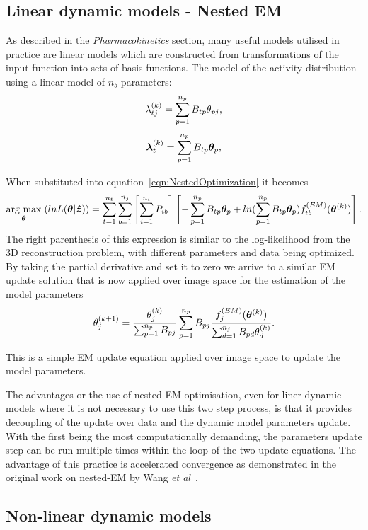 \subsection{Linear dynamic models - Nested EM}
As described in the \textit{Pharmacokinetics} section, many useful models utilised in practice are linear models which are constructed from transformations of the input function into sets of basis functions.
The model of the activity distribution using a linear model of $n_b$ parameters:
\begin{equation}
\lambda_{tj}^{(k)} = \sum_{p=1}^{n_p} B_{tp}   \theta_{pj} \\, 
\end{equation}
\begin{equation}
\bm\lambda_{t}^{(k)} = \sum_{p=1}^{n_p} B_{tp}  \bm\theta_{p}  \\,
\end{equation}

When substituted into equation~\ref{eqn:NestedOptimization} it becomes
\begin{equation}
\underset{\bm{\theta}}{\operatorname{arg}\,\operatorname{max}}\;(lnL(\bm{\theta}|\bm{\hat{z}})) = 
\sum_{t=1}^{n_t} \sum_{b=1}^{n_j} \left[ \sum_{i=1}^{n_i}  P_{ib} \right]
\left[ 
-\sum_{p=1}^{n_p} B_{tp} \bm\theta_{p} + 
ln( \sum_{p=1}^{n_p} B_{tp} \bm\theta_{p}) 
f_{tb}^{(EM)}(\bm{\theta}^{(k)})
\right] \\ .
\end{equation}
The right parenthesis of this expression is similar to the log-likelihood from the 3D reconstruction problem, with different parameters and data being optimized. By taking the partial derivative and set it to zero we arrive to a similar EM update solution that is now applied over image space for the estimation of the model parameters 
\begin{equation}
\theta_j^{(k+1)} = \frac{\theta_j^{(k)}}
{\sum_{p=1}^{n_p} B_{pj}} 
\sum_{p=1}^{n_p} B_{pj} 
\frac{f_{j}^{(EM)}(\bm{\theta}^{(k)})}{\sum_{d=1}^{n_j} B_{pd}\theta_d^{(k)} } \\.
\end{equation}

This is a simple EM update equation applied over image space to update the model parameters. 

The advantages or the use of nested EM optimisation, even for liner dynamic models where it is not necessary to use this two step process, is that it provides decoupling of the update over data and the dynamic model parameters update. With the first being the most computationally demanding, the parameters update step can be run multiple times within the loop of the two update equations. The advantage of this practice is accelerated convergence as demonstrated in the original work on nested-EM by Wang \textit{et al}~\cite{Wang2010}. 





\subsection{Non-linear dynamic models}